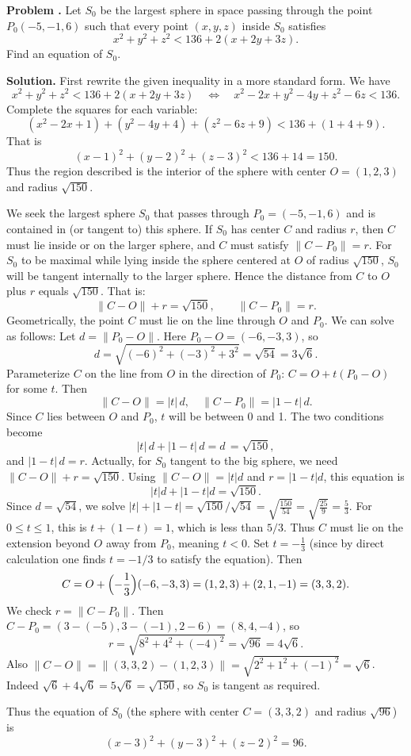 \documentclass[12pt, a4paper, oneside]{article}
\newcounter{problemname}
\newenvironment{problem}
  {\begin{shaded}\stepcounter{problemname}\par\noindent\textbf{Problem \arabic{problemname}. }\newline}
  {\end{shaded}\par}
\newenvironment{solution}
  {\par\noindent\textbf{Solution. }\newline}
  {\par}
\begin{document}
\newpage
\begin{problem}
Let \(S_0\) be the largest sphere in space passing through the point \(P_0(-5,-1,6)\) such that every point \((x,y,z)\) inside \(S_0\) satisfies 
\[
x^2 + y^2 + z^2 < 136 + 2(x + 2y + 3z).
\]
Find an equation of \(S_0\).
\end{problem}
\begin{solution}
First rewrite the given inequality in a more standard form. We have
\[
x^2 + y^2 + z^2 < 136 + 2(x + 2y + 3z)
\quad\Longleftrightarrow\quad
x^2 - 2x + y^2 - 4y + z^2 - 6z < 136.
\]
Complete the squares for each variable:
\[
(x^2 - 2x +1) + (y^2 - 4y +4) + (z^2 - 6z +9) < 136 + (1+4+9).
\]
That is
\[
(x-1)^2 + (y-2)^2 + (z-3)^2 < 136 + 14 = 150.
\]
Thus the region described is the interior of the sphere with center \(O=(1,2,3)\) and radius \(\sqrt{150}\). 

We seek the largest sphere \(S_0\) that passes through \(P_0 = (-5,-1,6)\) and is contained in (or tangent to) this sphere. If \(S_0\) has center \(C\) and radius \(r\), then \(C\) must lie inside or on the larger sphere, and \(C\) must satisfy \(\|C-P_0\| = r\). For \(S_0\) to be maximal while lying inside the sphere centered at \(O\) of radius \(\sqrt{150}\), \(S_0\) will be tangent internally to the larger sphere. Hence the distance from \(C\) to \(O\) plus \(r\) equals \(\sqrt{150}\). That is:
\[
\|C - O\| + r = \sqrt{150}, 
\qquad \|C - P_0\| = r.
\]
Geometrically, the point \(C\) must lie on the line through \(O\) and \(P_0\). We can solve as follows: Let \(d = \|P_0 - O\|\). Here \(P_0-O = (-6,-3,3)\), so 
\[
d = \sqrt{(-6)^2 + (-3)^2 + 3^2} = \sqrt{54} = 3\sqrt{6}.
\]
Parameterize \(C\) on the line from \(O\) in the direction of \(P_0\): \(C = O + t(P_0 - O)\) for some \(t\). Then 
\[
\|C - O\| = |t|\,d, 
\quad \|C - P_0\| = |1-t|\,d.
\]
Since \(C\) lies between \(O\) and \(P_0\), \(t\) will be between 0 and 1. The two conditions become
\[
|t|\,d + |1-t|\,d = d \,= \sqrt{150},
\]
and \(|1-t|\,d = r\). Actually, for \(S_0\) tangent to the big sphere, we need \(\|C-O\| + r = \sqrt{150}\). Using \(\|C-O\|=|t|d\) and \(r=|1-t|d\), this equation is
\[
|t|d + |1-t|d = \sqrt{150}.
\]
Since \(d = \sqrt{54}\), we solve \(|t|+|1-t| = \sqrt{150}/\sqrt{54} = \sqrt{\tfrac{150}{54}} = \sqrt{\tfrac{25}{9}} = \frac{5}{3}.\) For \(0 \le t \le 1\), this is \(t + (1-t) = 1\), which is less than \(5/3\). Thus \(C\) must lie on the extension beyond \(O\) away from \(P_0\), meaning \(t<0\). Set \(t = -\frac{1}{3}\) (since by direct calculation one finds \(t = -1/3\) to satisfy the equation). Then
\[
C = O + \Bigl(-\frac{1}{3}\Bigr)(-6,-3,3) = (1,2,3) + \left(2,1,-1\right) = (3,3,2).
\]
We check \(r = \|C-P_0\|\). Then \(C-P_0 = (3-(-5),3-(-1),2-6) = (8,4,-4)\), so 
\[
r = \sqrt{8^2 + 4^2 + (-4)^2} = \sqrt{96} = 4\sqrt{6}.
\]
Also \(\|C-O\| = \|(3,3,2)-(1,2,3)\| = \sqrt{2^2+1^2+(-1)^2} = \sqrt{6}\). Indeed \(\sqrt{6} + 4\sqrt{6} = 5\sqrt{6} = \sqrt{150}\), so \(S_0\) is tangent as required.

Thus the equation of \(S_0\) (the sphere with center \(C=(3,3,2)\) and radius \(\sqrt{96}\)) is
\[
(x-3)^2 + (y-3)^2 + (z-2)^2 = 96.
\]
\end{solution}
\end{document}
